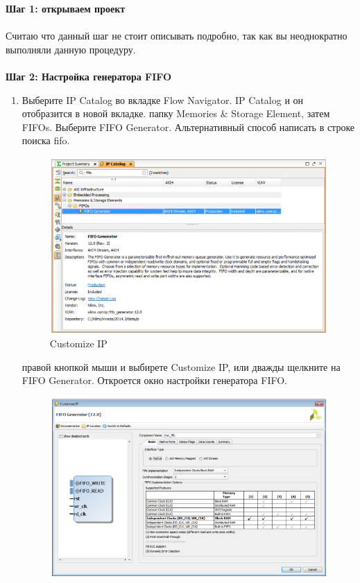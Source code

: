 \noindent 
\textbf{Шаг 1: открываем проект} \\ 
\\
Считаю что данный шаг не стоит описывать подробно, так как вы неоднократно выполняли данную процедуру.\\
\\
\textbf{Шаг 2: Настройка генератора FIFO}
\begin{enumerate} 
\item Выберите IP Catalog во вкладке  Flow Navigator. 
 IP Catalog и он отобразится в новой вкладке.
 папку Memories \& Storage Element, затем FIFOs. Выберите FIFO Generator. Альтернативный способ написать в строке поиска fifo.
\begin{figure}[h]
\centering
\includegraphics[width=1.1\textwidth]{fifo_ip_1}
\caption{ Customize IP}
\label{fifo_ip_1_label}
\end{figure}
 правой кнопкой мыши и выбирете Customize IP, или дважды щелкните на FIFO Generator. Откроется окно настройки генератора FIFO.
\begin{figure}[h]
\centering
\includegraphics[width=1.1\textwidth]{fifo_ip_2}

\end{figure}
\end{enumerate}
